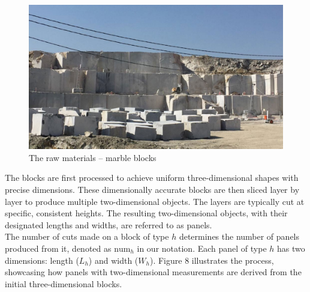 \documentclass[a4paper]{article}
\begin{document}
    \begin{figure}[h]
        \centering
        \includegraphics[scale = 0.29]{Image/raw_material.jpg}
        \caption{The raw materials – marble blocks }
    \end{figure}

    \pagebreak
    \vspace{0.2cm} \noindent
    The blocks are first processed to achieve uniform three-dimensional shapes with precise dimensions. These dimensionally accurate blocks are then sliced layer by layer to produce multiple two-dimensional objects. The layers are typically cut at specific, consistent heights. The resulting two-dimensional objects, with their designated lengths and widths, are referred to as panels.
    \vspace{0.2cm}\\
    The number of cuts made on a block of type \( h \) determines the number of panels produced from it, denoted as \( \text{num}_h \) in our notation. Each panel of type \( h \) has two dimensions: length (\( L_h \)) and width (\( W_h \)). Figure 8 illustrates the process, showcasing how panels with two-dimensional measurements are derived from the initial three-dimensional blocks.
\end{document}
